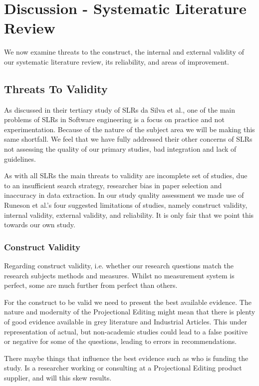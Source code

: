 \section{Discussion - Systematic Literature Review}
We now examine threats to the construct, the internal and external validity of our systematic literature review, its reliability, and areas of improvement.

 
\subsection{Threats To Validity}  
As discussed in their tertiary study of SLRs da Silva et al.\cite{DaSilvaFabioQ.B2011Syos}, one of the main problems of SLRs in Software engineering is a focus on practice and not experimentation.
Because of the nature of the subject area we will be making this same shortfall. 
We feel that we have fully addressed their other concerns of SLRs not assessing the quality of our primary studies, bad integration and lack of guidelines.

As with all SLRs the main threats to validity are incomplete set of studies, due to an insufficient search strategy, researcher bias in paper selection and inaccuracy in data extraction.
In our study quality assessment we made use of Runeson et al.'s\cite{runeson2009guidelines} four suggested limitations of studies, namely construct validity, internal validity, external validity, and reliability.
It is only fair that we point this towards our own study.

\subsubsection{Construct Validity}
Regarding construct validity, i.e. whether our research questions match the research subjects methods and measures.
Whilst no measurement system is perfect, some are much further from perfect than others.

For the construct to be valid we need to present the best available evidence.
The nature and modernity of the Projectional Editing might mean that there is plenty of good evidence available in grey literature and Industrial Articles. 
This under representation of actual, but non-academic studies could lead to a false positive or negative for some of the questions, leading to errors in recommendations.

There maybe things that influence the best evidence such as who is funding the study. 
Is a researcher working or consulting at a Projectional Editing product supplier, and will this skew results.

